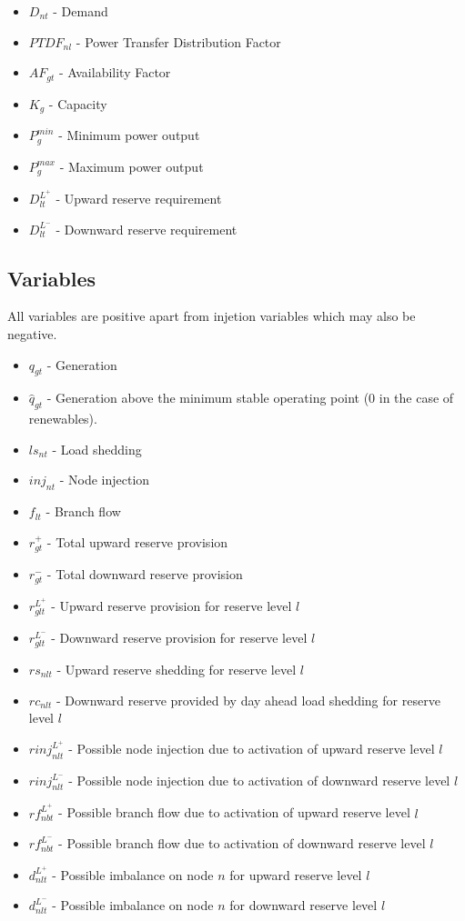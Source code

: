 \documentclass[number,times]{elsarticle}
\begin{document}
\begin{itemize}
    \item $D_{nt}$ - Demand
    \item $PTDF_{nl}$ - Power Transfer Distribution Factor
    \item $AF_{gt}$ - Availability Factor
    \item $K_g$ - Capacity
    \item $P^{min}_g$ - Minimum power output
    \item $P^{max}_g$ - Maximum power output
    \item $D^{L^+}_{lt}$ - Upward reserve requirement
    \item $D^{L^-}_{lt}$ - Downward reserve requirement
\end{itemize}

\subsection{Variables}

All variables are positive apart from injetion variables which may also be negative.

\begin{itemize}
    \item $q_{gt}$ - Generation
    \item $\hat{q}_{gt}$ - Generation above the minimum stable operating point (0 in the case of renewables).
    \item $ls_{nt}$ - Load shedding
    \item $inj_{nt}$ - Node injection
    \item $f_{lt}$ - Branch flow
    \item $r^+_{gt}$ - Total upward reserve provision
    \item $r^-_{gt}$ - Total downward reserve provision
    \item $r^{L^+}_{glt}$ - Upward reserve provision for reserve level $l$
    \item $r^{L^-}_{glt}$ - Downward reserve provision for reserve level $l$
    \item $rs_{nlt}$ - Upward reserve shedding for reserve level $l$
    \item $rc_{nlt}$ - Downward reserve provided by day ahead load shedding for reserve level $l$
    \item $rinj_{nlt}^{L^+}$ - Possible node injection due to activation of upward reserve level $l$
    \item $rinj_{nlt}^{L^-}$ - Possible node injection due to activation of downward reserve level $l$
    \item $rf_{nbt}^{L^+}$ - Possible branch flow due to activation of upward reserve level $l$
    \item $rf_{nbt}^{L^-}$ - Possible branch flow due to activation of downward reserve level $l$
    \item $d_{nlt}^{L^+}$ - Possible imbalance on node $n$ for upward reserve level $l$
    \item $d_{nlt}^{L^-}$ - Possible imbalance on node $n$ for downward reserve level $l$
\end{itemize}
\end{document}
